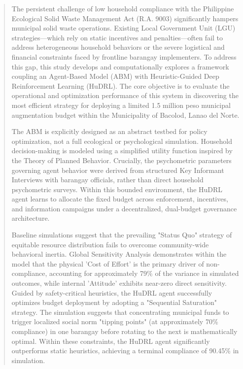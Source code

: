 \begin{abstract}

The persistent challenge of low household compliance with the Philippine Ecological Solid Waste Management Act (R.A. 9003) significantly hampers municipal solid waste operations. Existing Local Government Unit (LGU) strategies—which rely on static incentives and penalties—often fail to address heterogeneous household behaviors or the severe logistical and financial constraints faced by frontline barangay implementers. To address this gap, this study develops and computationally explores a framework coupling an Agent-Based Model (ABM) with Heuristic-Guided Deep Reinforcement Learning (HuDRL). The core objective is to evaluate the operational and optimization performance of this system in discovering the most efficient strategy for deploying a limited 1.5 million peso municipal augmentation budget within the Municipality of Bacolod, Lanao del Norte.

The ABM is explicitly designed as an abstract testbed for policy optimization, not a full ecological or psychological simulation. Household decision-making is modeled using a simplified utility function inspired by the Theory of Planned Behavior. Crucially, the psychometric parameters governing agent behavior were derived from structured Key Informant Interviews with barangay officials, rather than direct household psychometric surveys. Within this bounded environment, the HuDRL agent learns to allocate the fixed budget across enforcement, incentives, and information campaigns under a decentralized, dual-budget governance architecture.

Baseline simulations suggest that the prevailing "Status Quo" strategy of equitable resource distribution fails to overcome community-wide behavioral inertia. Global Sensitivity Analysis demonstrates within the model that the physical 'Cost of Effort' is the primary driver of non-compliance, accounting for approximately 79\% of the variance in simulated outcomes, while internal 'Attitude' exhibits near-zero direct sensitivity. Guided by safety-critical heuristics, the HuDRL agent successfully optimizes budget deployment by adopting a "Sequential Saturation" strategy. The simulation suggests that concentrating municipal funds to trigger localized social norm "tipping points" (at approximately 70\% compliance) in one barangay before rotating to the next is mathematically optimal. Within these constraints, the HuDRL agent significantly outperforms static heuristics, achieving a terminal compliance of 90.45\% in simulation.


\end{abstract}
